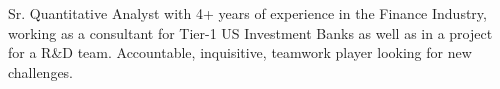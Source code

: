 

\begin{cvparagraph}

Sr. Quantitative Analyst with 4+ years of experience in the Finance Industry, working as a consultant for Tier-1 US Investment Banks as well as in a project for a R\&D team. Accountable, inquisitive, teamwork player looking for new challenges.
\end{cvparagraph}
